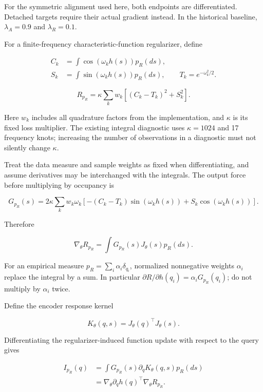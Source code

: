 \documentclass[11pt]{article}
\begin{document}
For the symmetric alignment used here, both endpoints are
differentiated. Detached targets require their actual gradient instead.
In the historical baseline, \(\lambda_A=0.9\) and \(\lambda_R=0.1\).

For a finite-frequency characteristic-function regularizer, define

\[
\begin{aligned}
C_k&=\int\cos(\omega_k h(s))p_R(ds),\\
S_k&=\int\sin(\omega_k h(s))p_R(ds),\qquad T_k=e^{-\omega_k^2/2}.\end{aligned}
\]

\begin{equation}\label{eq:cf-loss}
R_{p_R}=\kappa\sum_k w_k[(C_k-T_k)^2+S_k^2].
\end{equation}

Here \(w_k\) includes all quadrature factors from the implementation,
and \(\kappa\) is its fixed loss multiplier. The existing integral
diagnostic uses \(\kappa=1024\) and 17 frequency knots; increasing the
number of observations in a diagnostic must not silently change
\(\kappa\).

Treat the data measure and sample weights as fixed when differentiating,
and assume derivatives may be interchanged with the integrals. The
output force before multiplying by occupancy is

\begin{equation}\label{eq:output-force}
G_{p_R}(s)=2\kappa\sum_k w_k\omega_k
\left[-(C_k-T_k)\sin(\omega_k h(s))+S_k\cos(\omega_k h(s))\right].
\end{equation}

Therefore

\begin{equation}\label{eq:gradient}
\nabla_\theta R_{p_R}=\int G_{p_R}(s)J_\theta(s)p_R(ds).
\end{equation}

For an empirical measure \(p_R=\sum_i\alpha_i\delta_{q_i}\), normalized
nonnegative weights \(\alpha_i\) replace the integral by a sum. In
particular \(\partial R/\partial h(q_i)=\alpha_iG_{p_R}(q_i)\); do not
multiply by \(\alpha_i\) twice.

Define the encoder response kernel

\[
K_\theta(q,s)=J_\theta(q)^\top J_\theta(s).
\]

Differentiating the regularizer-induced function update with respect to
the query gives

\begin{equation}\label{eq:kernel-contraction}
\begin{aligned}
I_{p_R}(q)&=\int G_{p_R}(s)\partial_qK_\theta(q,s)p_R(ds)\\
&=\nabla_\theta\partial_qh(q)^\top\nabla_\theta R_{p_R}.\end{aligned}
\end{equation}
\end{document}
